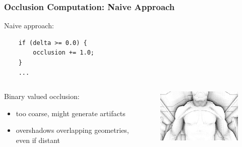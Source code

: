 \documentclass{beamer}
\newcommand{\redtext}[1]{\textcolor{myred}{#1}}
\begin{document}
\begin{frame}[fragile]
\frametitle{Occlusion Computation: Naive Approach}
Naive approach:
\begin{verbatim}
    if (delta >= 0.0) {
        occlusion += 1.0;
    }
    ...
\end{verbatim}

\begin{columns}
    \begin{column}{0.45\linewidth}
        \redtext{Binary} valued occlusion:
        \begin{itemize}
            \item \redtext{too coarse}, might generate artifacts
            \item \redtext{overshadows} overlapping geometries, even if distant
        \end{itemize}
    \end{column}
    \begin{column}{0.45\linewidth}
        \begin{figure}
            \centering
            \includegraphics[width=0.8\linewidth]{images/occlusion_naive}
        \end{figure}
    \end{column}
\end{columns}

\end{frame}
\end{document}
